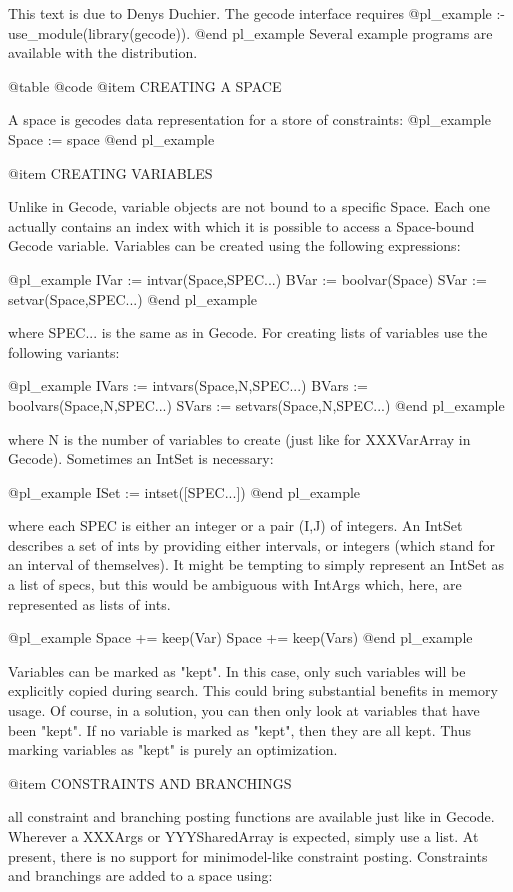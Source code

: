 This text is due to Denys Duchier. The gecode interface requires
@pl_example
:- use_module(library(gecode)).
@end pl_example
Several example programs are available with the distribution.

@table @code
@item CREATING A SPACE

A space is gecodes data representation for a store of constraints:
@pl_example
    Space := space
@end pl_example


@item CREATING VARIABLES

Unlike in Gecode, variable objects are not bound to a specific Space.  Each one
actually contains an index with which it is possible to access a Space-bound
Gecode variable.  Variables can be created using the following expressions:

@pl_example
   IVar := intvar(Space,SPEC...)
   BVar := boolvar(Space)
   SVar := setvar(Space,SPEC...)
@end pl_example

where SPEC... is the same as in Gecode.  For creating lists of variables use
the following variants:

@pl_example
   IVars := intvars(Space,N,SPEC...)
   BVars := boolvars(Space,N,SPEC...)
   SVars := setvars(Space,N,SPEC...)
@end pl_example

where N is the number of variables to create (just like for XXXVarArray in
Gecode).  Sometimes an IntSet is necessary:

@pl_example
   ISet := intset([SPEC...])
@end pl_example

where each SPEC is either an integer or a pair (I,J) of integers.  An IntSet
describes a set of ints by providing either intervals, or integers (which stand
for an interval of themselves).  It might be tempting to simply represent an
IntSet as a list of specs, but this would be ambiguous with IntArgs which,
here, are represented as lists of ints.

@pl_example
   Space += keep(Var)
   Space += keep(Vars)
@end pl_example

Variables can be marked as "kept".  In this case, only such variables will be
explicitly copied during search.  This could bring substantial benefits in
memory usage.  Of course, in a solution, you can then only look at variables
that have been "kept".  If no variable is marked as "kept", then they are all
kept.  Thus marking variables as "kept" is purely an optimization.


@item CONSTRAINTS AND BRANCHINGS

all constraint and branching posting functions are available just like in
Gecode.  Wherever a XXXArgs or YYYSharedArray is expected, simply use a list.
At present, there is no support for minimodel-like constraint posting.
Constraints and branchings are added to a space using:

